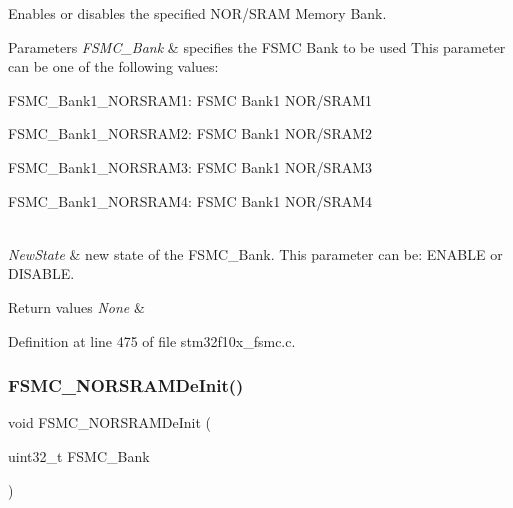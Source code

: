 Enables or disables the specified N\+O\+R/\+S\+R\+AM Memory Bank. 


\begin{DoxyParams}{Parameters}
{\em F\+S\+M\+C\+\_\+\+Bank} & specifies the F\+S\+MC Bank to be used This parameter can be one of the following values\+: \begin{DoxyItemize}
\item F\+S\+M\+C\+\_\+\+Bank1\+\_\+\+N\+O\+R\+S\+R\+A\+M1\+: F\+S\+MC Bank1 N\+O\+R/\+S\+R\+A\+M1 \item F\+S\+M\+C\+\_\+\+Bank1\+\_\+\+N\+O\+R\+S\+R\+A\+M2\+: F\+S\+MC Bank1 N\+O\+R/\+S\+R\+A\+M2 \item F\+S\+M\+C\+\_\+\+Bank1\+\_\+\+N\+O\+R\+S\+R\+A\+M3\+: F\+S\+MC Bank1 N\+O\+R/\+S\+R\+A\+M3 \item F\+S\+M\+C\+\_\+\+Bank1\+\_\+\+N\+O\+R\+S\+R\+A\+M4\+: F\+S\+MC Bank1 N\+O\+R/\+S\+R\+A\+M4 \end{DoxyItemize}
\\
\hline
{\em New\+State} & new state of the F\+S\+M\+C\+\_\+\+Bank. This parameter can be\+: E\+N\+A\+B\+LE or D\+I\+S\+A\+B\+LE. \\
\hline
\end{DoxyParams}

\begin{DoxyRetVals}{Return values}
{\em None} & \\
\hline
\end{DoxyRetVals}


Definition at line 475 of file stm32f10x\+\_\+fsmc.\+c.

\mbox{\label{group___f_s_m_c___exported___functions_gaab3e6648e8a584e73785361ac960eded}} 
\subsubsection{\texorpdfstring{F\+S\+M\+C\+\_\+\+N\+O\+R\+S\+R\+A\+M\+De\+Init()}{FSMC\_NORSRAMDeInit()}}
{\footnotesize\ttfamily void F\+S\+M\+C\+\_\+\+N\+O\+R\+S\+R\+A\+M\+De\+Init (\begin{DoxyParamCaption}\item[{uint32\+\_\+t}]{F\+S\+M\+C\+\_\+\+Bank }\end{DoxyParamCaption})}



